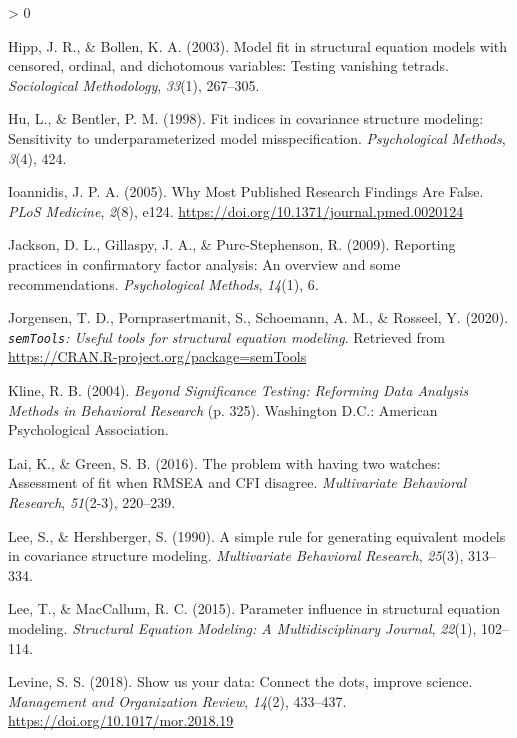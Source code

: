 \documentclass[
  english,
  man]{apa6}
\newlength{\cslhangindent}
\newenvironment{CSLReferences}[2] %
 {%
  \setlength{\parindent}{0pt}
  \ifodd #1 \everypar{\setlength{\hangindent}{\cslhangindent}}\ignorespaces\fi
  \ifnum #2 > 0
  \setlength{\parskip}{#2\baselineskip}
  \fi
 }%
 {}
\begin{document}
\begin{CSLReferences}{1}{0}
\leavevmode\hypertarget{ref-hipp2003model}{}%
Hipp, J. R., \& Bollen, K. A. (2003). Model fit in structural equation models with censored, ordinal, and dichotomous variables: Testing vanishing tetrads. \emph{Sociological Methodology}, \emph{33}(1), 267--305.

\leavevmode\hypertarget{ref-hu1998fit}{}%
Hu, L., \& Bentler, P. M. (1998). Fit indices in covariance structure modeling: Sensitivity to underparameterized model misspecification. \emph{Psychological Methods}, \emph{3}(4), 424.

\leavevmode\hypertarget{ref-Ioannidis2005}{}%
Ioannidis, J. P. A. (2005). {Why Most Published Research Findings Are False}. \emph{PLoS Medicine}, \emph{2}(8), e124. \url{https://doi.org/10.1371/journal.pmed.0020124}

\leavevmode\hypertarget{ref-jackson2009reporting}{}%
Jackson, D. L., Gillaspy, J. A., \& Purc-Stephenson, R. (2009). Reporting practices in confirmatory factor analysis: An overview and some recommendations. \emph{Psychological Methods}, \emph{14}(1), 6.

\leavevmode\hypertarget{ref-semtools}{}%
Jorgensen, T. D., Pornprasertmanit, S., Schoemann, A. M., \& Rosseel, Y. (2020). \emph{\texttt{semTools}: {U}seful tools for structural equation modeling}. Retrieved from \url{https://CRAN.R-project.org/package=semTools}

\leavevmode\hypertarget{ref-Kline2004}{}%
Kline, R. B. (2004). \emph{{Beyond Significance Testing: Reforming Data Analysis Methods in Behavioral Research}} (p. 325). Washington D.C.: American Psychological Association.

\leavevmode\hypertarget{ref-lai2016problem}{}%
Lai, K., \& Green, S. B. (2016). The problem with having two watches: Assessment of fit when {RMSEA} and {CFI} disagree. \emph{Multivariate Behavioral Research}, \emph{51}(2-3), 220--239.

\leavevmode\hypertarget{ref-Lee90}{}%
Lee, S., \& Hershberger, S. (1990). A simple rule for generating equivalent models in covariance structure modeling. \emph{Multivariate Behavioral Research}, \emph{25}(3), 313--334.

\leavevmode\hypertarget{ref-lee2015parameter}{}%
Lee, T., \& MacCallum, R. C. (2015). Parameter influence in structural equation modeling. \emph{Structural Equation Modeling: A Multidisciplinary Journal}, \emph{22}(1), 102--114.

\leavevmode\hypertarget{ref-Levine2018}{}%
Levine, S. S. (2018). {Show us your data: Connect the dots, improve science}. \emph{Management and Organization Review}, \emph{14}(2), 433--437. \url{https://doi.org/10.1017/mor.2018.19}


\end{CSLReferences}
\end{document}
